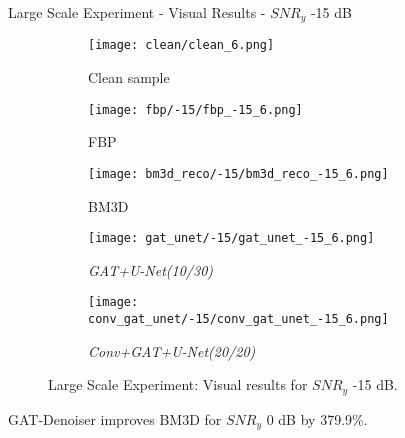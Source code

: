 \begin{frame}{Large Scale Experiment - Visual Results - $SNR_y$ -15 dB}
    \begin{figure}
        \captionsetup[subfigure]{justification=centering}
        \centering
        \begin{subfigure}[t]{0.18\textwidth}
          \texttt{[image: clean/clean\_6.png]}
          \caption{Clean sample}
        \end{subfigure} \hfill
        \begin{subfigure}[t]{0.18\textwidth}
          \texttt{[image: fbp/-15/fbp\_-15\_6.png]}
          \caption{FBP}
        \end{subfigure} \hfill
        \begin{subfigure}[t]{0.18\textwidth}
          \texttt{[image: bm3d\_reco/-15/bm3d\_reco\_-15\_6.png]}
          \caption{BM3D}
        \end{subfigure} \hfill
        \begin{subfigure}[t]{0.18\textwidth}
          \texttt{[image: gat\_unet/-15/gat\_unet\_-15\_6.png]}
          \caption{\textit{GAT+U-Net(10/30)}}
        \end{subfigure} \hfill
        \begin{subfigure}[t]{0.18\textwidth}
          \texttt{[image: conv\_gat\_unet/-15/conv\_gat\_unet\_-15\_6.png]}
          \caption{\textit{Conv+GAT+U-Net(20/20)}}
        \end{subfigure} \hfill
        \caption{Large Scale Experiment: Visual results for $SNR_y$ -15 dB.}
      \end{figure}
      
    
      \begin{tcolorbox}[colback=red!5!white,hide=<1>, alert=<2>, colframe=red!75!black]
        GAT-Denoiser improves BM3D for $SNR_y$ 0 dB by 379.9\%.
        \end{tcolorbox}
        
\end{frame}
